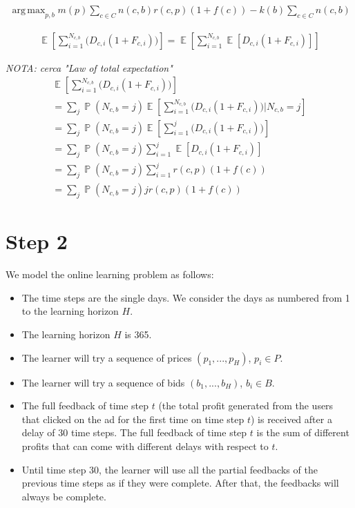 \documentclass[11pt]{article} %
\DeclareMathOperator{\EX}{\mathbb{E}}
\DeclareMathOperator{\Prob}{\mathbb{P}}
\DeclareMathOperator*{\argmax}{arg\,max}
\begin{document}
\begin{align*}
\argmax_{p,b}{m(p)\sum_{c \in C}{n(c,b)r(c,p)(1+f(c))}-k(b)\sum_{c \in C}{n(c,b)}}
\end{align*}

{\color{red}
\begin{align*}
\EX\left[\sum_{i =1}^{N_{c,b}}{\bigg( D_{c,i}(1+F_{c,i})\bigg)}\right]=\EX\left[\sum_{i =1}^{N_{c,b}}{\EX[D_{c,i}(1+F_{c,i})]}\right]
\end{align*}

\textit{NOTA: cerca "Law of total expectation"}
\begin{align*}
\EX\left[\sum_{i =1}^{N_{c,b}}{\bigg( D_{c,i}(1+F_{c,i})\bigg)}\right]\\
=\sum_{j}{\Prob(N_{c,b}=j)\EX\left[\sum_{i =1}^{N_{c,b}}{\bigg( D_{c,i}(1+F_{c,i})\bigg)}|N_{c,b}=j\right]}\\
=\sum_{j}{\Prob(N_{c,b}=j)\EX\left[\sum_{i =1}^{j}{\bigg( D_{c,i}(1+F_{c,i})\bigg)}\right]}\\
=\sum_{j}{\Prob(N_{c,b}=j)\sum_{i =1}^{j}{\EX\left[ D_{c,i}(1+F_{c,i})\right]}}\\
=\sum_{j}{\Prob(N_{c,b}=j)\sum_{i =1}^{j}{ r(c,p)(1+f(c))}}\\
=\sum_{j}{\Prob(N_{c,b}=j) jr(c,p)(1+f(c))}
\end{align*}
}

\section{Step 2}
We model the online learning problem as follows:
\begin{itemize}
\item The time steps are the single days. We consider the days as numbered from 1 to the learning horizon $H$.
\item The learning horizon $H$ is 365.
\item The learner will try a sequence of prices $(p_1, ..., p_H)$, $p_i \in P$.
\item The learner will try a sequence of bids $(b_1, ..., b_H)$, $b_i \in B$.
\item The full feedback of time step $t$ (the total profit generated from the users that clicked on the ad for the first time on time step $t$) is received after a delay of 30 time steps. The full feedback of time step $t$ is the sum of different profits that can come with different delays with respect to $t$.
\item Until time step 30, the learner will use all the partial feedbacks of the previous time steps as if they were complete. After that, the feedbacks will always be complete.
\end{itemize}
\end{document}
